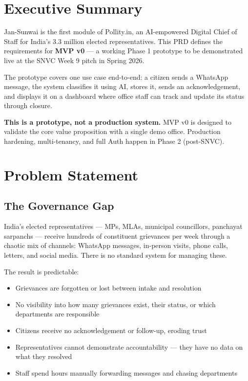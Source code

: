 \documentclass[11pt, a4paper]{article}
\begin{document}
\tableofcontents
\newpage

\section{Executive Summary}

Jan-Sunwai is the first module of Pollity.in, an AI-empowered Digital Chief of Staff for India's 3.3 million elected representatives. This PRD defines the requirements for \textbf{MVP v0} --- a working Phase 1 prototype to be demonstrated live at the SNVC Week 9 pitch in Spring 2026.

The prototype covers one use case end-to-end: a citizen sends a WhatsApp message, the system classifies it using AI, stores it, sends an acknowledgement, and displays it on a dashboard where office staff can track and update its status through closure.

\begin{notebox}
\textbf{This is a prototype, not a production system.} MVP v0 is designed to validate the core value proposition with a single demo office. Production hardening, multi-tenancy, and full Auth happen in Phase 2 (post-SNVC).
\end{notebox}

\newpage

\section{Problem Statement}

\subsection{The Governance Gap}

India's elected representatives --- MPs, MLAs, municipal councillors, panchayat sarpanchs --- receive hundreds of constituent grievances per week through a chaotic mix of channels: WhatsApp messages, in-person visits, phone calls, letters, and social media. There is no standard system for managing these.

The result is predictable:
\begin{itemize}[leftmargin=1.5em]
  \item Grievances are forgotten or lost between intake and resolution
  \item No visibility into how many grievances exist, their status, or which departments are responsible
  \item Citizens receive no acknowledgement or follow-up, eroding trust
  \item Representatives cannot demonstrate accountability --- they have no data on what they resolved
  \item Staff spend hours manually forwarding messages and chasing departments
\end{itemize}
\end{document}

